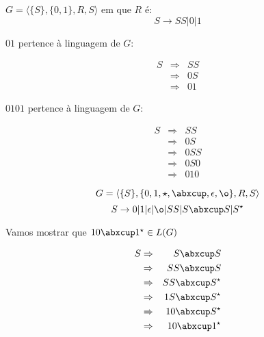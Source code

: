 \begin{example}
$G = \langle \{S\}, \{0,1\}, R, S\rangle$ em que $R$ é:
\begin{displaymath}
  S \to SS | 0 | 1
\end{displaymath}

$01$ pertence à linguagem de $G$:

\begin{eqnarray*}
  S & \Rightarrow & SS\\
    & \Rightarrow & 0S \\
    & \Rightarrow & 01
\end{eqnarray*}

$0101$ pertence à linguagem de $G$:

\begin{eqnarray*}
  S & \Rightarrow & SS \\
    & \Rightarrow & 0S \\
    & \Rightarrow & 0SS \\
    & \Rightarrow & 0S0 \\
    & \Rightarrow & 010
\end{eqnarray*}
\end{example}


\begin{example}
\begin{displaymath}
G = \langle \{S\}, \{0, 1, \star, \abxcup, \epsilon, \o\}, R, S\rangle
\end{displaymath}
\begin{displaymath}
  S \to 0 | 1 | \epsilon | \o | SS | S \abxcup S | S^\star
\end{displaymath}

Vamos mostrar que $10 \abxcup 1^\star \in L(G)$

\begin{eqnarray*}
  S & \Rightarrow & S \abxcup S \\
    & \Rightarrow & SS \abxcup S \\
    & \Rightarrow & SS \abxcup S^\star\\
    & \Rightarrow & 1S \abxcup S^\star\\
    & \Rightarrow & 10 \abxcup S^\star\\
    & \Rightarrow & 10 \abxcup 1^\star
\end{eqnarray*}
\end{example}

